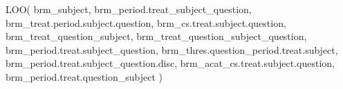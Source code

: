 \documentclass[
  12pt,
  a4paper,
  extrafontsizes,
  onecolumn,
  openright]{memoir}
\newenvironment{Shaded}{\begin{snugshade}}{\end{snugshade}}
\newcommand{\FunctionTok}[1]{\textcolor[rgb]{0.28,0.35,0.67}{#1}}
\newcommand{\NormalTok}[1]{\textcolor[rgb]{0.00,0.23,0.31}{#1}}
\begin{document}
\begin{Shaded}
\begin{Highlighting}[]
\FunctionTok{LOO}\NormalTok{(}
\NormalTok{    brm\_subject,}
\NormalTok{    brm\_period.treat\_subject\_question,}
\NormalTok{    brm\_treat.period.subject.question,}
\NormalTok{    brm\_cs.treat.subject.question,}
\NormalTok{    brm\_treat\_question\_subject,}
\NormalTok{    brm\_treat\_question\_subject\_question,}
\NormalTok{    brm\_period.treat.subject\_question,}
\NormalTok{    brm\_thres.question\_period.treat.subject,}
\NormalTok{    brm\_period.treat.subject\_question.disc,}
\NormalTok{    brm\_acat\_cs.treat.subject.question,}
\NormalTok{    brm\_period.treat.question\_subject}
\NormalTok{)}
\end{Highlighting}
\end{Shaded}
\end{document}
